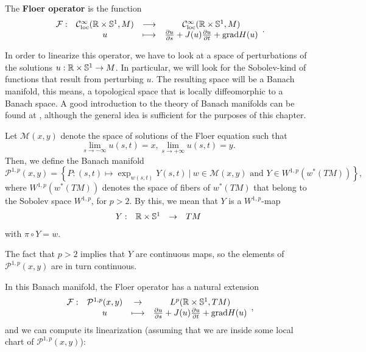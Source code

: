\begin{deff} \label{deff:floer_operator}
The {\bf Floer operator} is the function
\[\begin{array}{rccc} \mathcal{F} : & \mathcal{C}^{\infty}_{\mathrm{loc}}(\mathbb{R}\times\mathbb{S}^1,M) & \longrightarrow & \mathcal{C}^{\infty}_{\mathrm{loc}}(\mathbb{R}\times\mathbb{S}^1,M) \\ & u & \longmapsto & \frac{\partial u}{\partial s} + J(u) \frac{\partial u}{\partial t} + \mathrm{grad} H (u) \end{array} .\]
\end{deff}

In order to linearize this operator, we have to look at a space of perturbations of the solutions $u : \mathbb{R} \times \mathbb{S}^1 \rightarrow M$. In particular, we will look for the Sobolev-kind of functions that result from perturbing $u$. The resulting space will be a Banach manifold, this means, a topological space that is locally diffeomorphic to a Banach space. A good introduction to the theory of Banach manifolds can be found at \cite{abraham2012manifolds}, although the general idea is sufficient for the purposes of this chapter.

\begin{deff}
Let $\mathcal{M}(x,y)$ denote the space of solutions of the Floer equation such that
\[\lim_{s \rightarrow -\infty} u(s,t) = x, \lim_{s \rightarrow +\infty} u(s,t) = y.\]
Then, we define the Banach manifold
\[\mathcal{P}^{1,p}(x,y) = \left\{P : (s,t) \mapsto \exp_{w(s,t)}Y(s,t) \ | \ w \in \mathcal{M}(x,y) \text{ and } Y \in W^{1,p}(w^{\ast}(TM))\right\} ,\]
where $W^{1,p}(w^{\ast}(TM))$ denotes the space of fibers of $w^{\ast}(TM)$ that belong to the Sobolev space $W^{1,p}$, for $p > 2$. By this, we mean that $Y$ is a $W^{1,p}$-map
\[\begin{array}{rccc} Y : & \mathbb{R} \times \mathbb{S}^1 & \rightarrow & TM \end{array}\]
with $\pi \circ Y = w$.
\end{deff}

\begin{rmrk}
The fact that $p > 2$ implies that $Y$ are continuous maps, so the elements of $\mathcal{P}^{1,p}(x,y)$ are in turn continuous.
\end{rmrk}

In this Banach manifold, the Floer operator has a natural extension
\[\begin{array}{rccc} \mathcal{F} : & \mathcal{P}^{1,p}(x,y) & \rightarrow & L^p(\mathbb{R} \times \mathbb{S}^1, TM) \\ & u & \longmapsto & \frac{\partial u}{\partial s} + J(u)\frac{\partial u}{\partial t} + \mathrm{grad} H(u) \end{array} ,\]
and we can compute its linearization (assuming that we are inside some local chart of $\mathcal{P}^{1,p}(x,y)$):

